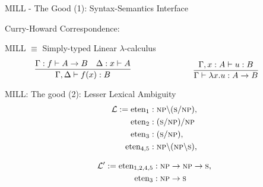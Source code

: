 \documentclass{beamer}
\newlength{\arrow}
\begin{document}
\begin{frame}{MILL - The Good (1): Syntax-Semantics Interface}

	Curry-Howard Correspondence:
	
	\begin{center}{
		MILL $\equiv$ Simply-typed Linear $\lambda$-calculus}
		\pause
		\begin{align*}
		    \begin{minipage}{0.5\textwidth}
				\[
			        \infer{\Gamma, \Delta \vdash f(x): B}{
			            \Gamma: f \vdash A \rightarrow B
			            &
			            \Delta: x \vdash A
			        }
			    \]
			    \end{minipage}    \begin{minipage}{0.5\textwidth}
			    \[
			        \infer{\Gamma \vdash \lambda x. u : A \rightarrow B}{
			            \Gamma, x: A \vdash u: B
			        }
			    \]
	    	\end{minipage}
		\end{align*}
	
	\large
	\smiley	
	\vfill
	\end{center}
\end{frame}

\begin{frame}{MILL: The good (2): Lesser Lexical Ambiguity}
	\begin{align*}
	\mathcal{L} := \text{eten}_1 &: \textsc{np}\backslash (\textsc{s}/\textsc{np}), \\
					\text{eten}_2 &: (\textsc{s}/\textsc{np})/\textsc{np} \\
					\text{eten}_3 &: (\textsc{s}/\textsc{np}), \\
					\text{eten}_{4,5} &: \textsc{np}\backslash (\textsc{np}\backslash \textsc{s}), \\
	\end{align*}
	
	\pause
	\begin{align*}
	\mathcal{L}' := \text{eten}_{1,2,4,5} &: \textsc{np} \to \textsc{np} \to \textsc{s}, \\
					\text{eten}_3 &: \textsc{np} \to \textsc{s}
	\end{align*}

	
	\large
	\center
		\smiley
			\vfill 

\end{frame}
\end{document}
